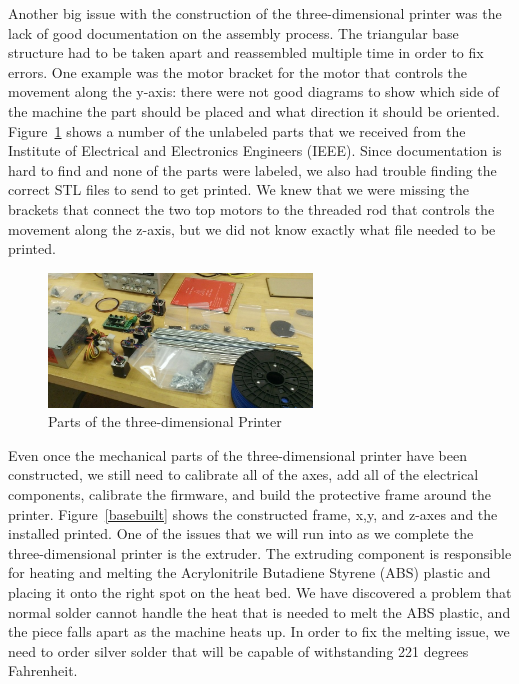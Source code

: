 \documentclass[pdftex,10.5pt]{report}
\begin{document}
Another big issue with the construction of the three-dimensional printer was the lack of good documentation on the assembly process. The triangular base structure had to be taken apart and reassembled multiple time in order to fix errors. One example was the motor bracket for the motor that controls the movement along the y-axis: there were not good diagrams to show which side of the machine the part should be placed and what direction it should be oriented. Figure~\ref{parts} shows a number of the unlabeled parts that we received from the Institute of Electrical and Electronics Engineers (IEEE). Since documentation is hard to find and none of the parts were labeled, we also had trouble finding the correct STL files to send to get printed. We knew that we were missing the brackets that connect the two top motors to the threaded rod that controls the movement along the z-axis, but we did not know exactly what file needed to be printed.

\begin{figure}[H]
	\centering
	\includegraphics[width=70mm]{figures/WP_20130223_002.jpg}
	\caption{Parts of the three-dimensional Printer}
	\label{parts}
\end{figure}

Even once the mechanical parts of the three-dimensional printer have been constructed, we still need to calibrate all of the axes, add all of the electrical components, calibrate the firmware, and build the protective frame around the printer. Figure~\ref{basebuilt} shows the constructed frame, x,y, and z-axes and the installed printed. One of the issues that we will run into as we complete the three-dimensional printer is the extruder. The extruding component is responsible for heating and melting the Acrylonitrile Butadiene Styrene (ABS) plastic and placing it onto the right spot on the heat bed. We have discovered a problem that normal solder cannot handle the heat that is needed to melt the ABS plastic, and the piece falls apart as the machine heats up. In order to fix the melting issue, we need to order silver solder that will be capable of withstanding 221 degrees Fahrenheit. 
\end{document}
